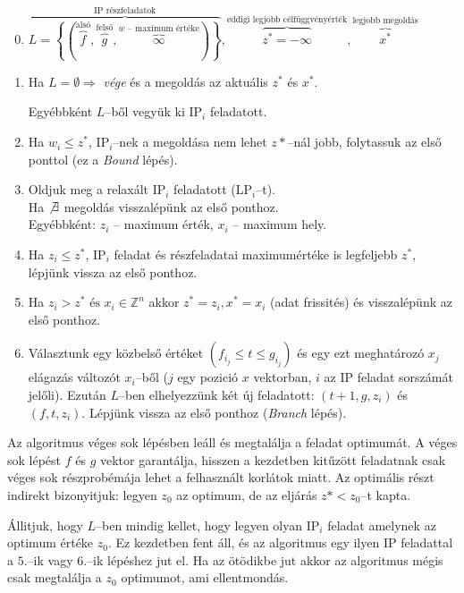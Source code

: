 \begin{enumerate}
  \setcounter{enumi}{-1}
  \item $\overbrace{L=\left\{ \left(
  \overbrace{f}^{\text{alsó}},\overbrace{g}^{\text{felső}},\overbrace{\infty}^{w
  \text{ -- maximum értéke}} \right) \right\}}^{\text{IP részfeladatok}},
  \overbrace{z^*=-\infty}^{\text{eddigi legjobb célfüggvényérték}},
  \overbrace{x^*}^{\text{legjobb megoldás}}$
  \item Ha $L=\emptyset \Rightarrow$ \emph{vége} és a megoldás az aktuális $z^*$
  és $x^*$.
  
  Egyébbként $L$--ből vegyük ki IP$_i$ feladatott.
  \item Ha $w_i \leq z^*$, IP$_i$--nek a megoldása nem lehet $z*$--nál jobb,
  folytassuk az első ponttol (ez a \emph{Bound} lépés).
  \item Oldjuk meg a relaxált IP$_i$ feladatott (LP$_i$--t).
  \\ Ha $\not \exists$ megoldás visszalépünk az első ponthoz.
  \\ Egyébbként: $z_i$ -- maximum érték,  $x_i$ -- maximum hely.
  \item Ha $z_i \leq z^*$, IP$_i$ feladat és részfeladatai maximumértéke is
  legfeljebb $z^*$, lépjünk vissza az első ponthoz.
  \item Ha $z_i > z^* \mbox{ és } x_i \in \mathbb{Z}^{n}$ akkor $ z^* = z_i, x^* =
  x_i$ (adat frissités) és visszalépünk az első ponthoz.
  \item Választunk egy közbelső értéket $(f_{i_j} \leq t \leq g_{i_j})$ és egy
  ezt meghatározó $x_j$ elágazás változót $x_i$--ből ($j$ egy pozició $x$
  vektorban, $i$ az IP feladat sorszámát jelőli). Ezután $L$--ben elhelyezzünk
  két új feladatott:  $(t+1, g, z_i)$ és $(f, t, z_i)$. Lépjünk vissza az első
  ponthoz (\emph{Branch} lépés).
\end{enumerate} 

Az algoritmus véges sok lépésben leáll és megtalálja a feladat optimumát. A
véges sok lépést $f$ és $g$ vektor garantálja, hisszen a kezdetben kitűzött
feladatnak csak véges sok részprobémája lehet a felhasznált korlátok miatt. Az
optimális részt indirekt bizonyitjuk: legyen $z_0$ az optimum, de az eljárás
$z*<z_0$--t kapta.

Állitjuk, hogy $L$--ben mindig kellet, hogy legyen olyan IP$_i$ feladat amelynek
az optimum értéke $z_0$. Ez kezdetben fent áll, és az algoritmus egy ilyen IP
feladattal a $5.$--ik vagy $6.$--ik lépéshez jut el. Ha az ötödikbe jut akkor az
algoritmus mégis csak megtalálja a $z_0$ optimumot, ami ellentmondás.

